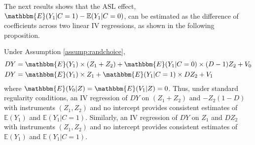 The next results shows that the $\text{ASL}$ effect, $\mathbbm{E}(Y_1|C=1) - \mathbb{E}(Y_1|C=0)$, can be estimated as the difference of coefficients across two linear IV regressions, as shown in the following proposition.

\begin{prop}
\label{prop:ASLreg}
Under Assumption \ref{assump:randchoice},
\begin{align}
\label{eq:ASL0}
    D Y &= \mathbbm{E}(Y_{1}) \times(Z_1 + Z_2) + \mathbbm{E}(Y_{1}|C=0)\times (D - 1)Z_2 + V_{0}\\
\label{eq:ASL1}
    D Y &= \mathbbm{E}(Y_{1}) \times Z_1 + \mathbbm{E}(Y_{1}|C=1)\times D Z_2+ V_{1}
\end{align}
where $\mathbbm{E}(V_0|Z) = \mathbbm{E}(V_1|Z) = 0$.
Thus, under standard regularity conditions, an IV regression of $DY$ on $(Z_1 + Z_2)$ and $-Z_2(1 - D)$ with instruments $(Z_1, Z_2)$ and no intercept provides consistent estimates of $\mathbb{E}(Y_1)$ and $\mathbb{E}(Y_1|C=1)$.
Similarly, an IV regression of $DY$ on $Z_1$ and $DZ_2$ with instruments $(Z_1, Z_2)$ and no intercept provides consistent estimates of $\mathbb{E}(Y_1)$ and $\mathbb{E}(Y_1|C=1)$. 
\end{prop}


